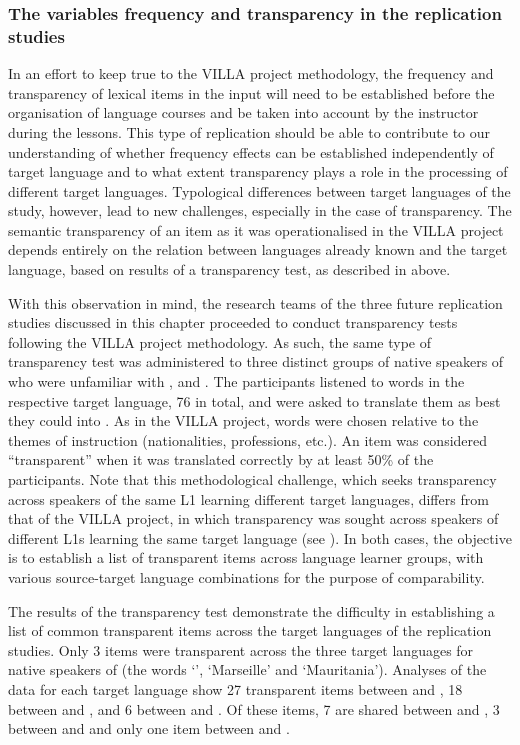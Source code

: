 \documentclass[output=paper,colorlinks,citecolor=brown,modfonts,nonflat]{../langscibook}
\begin{document}
\clearpage
\subsubsection{The variables frequency and transparency in the replication studies}\label{sec:watorek:4.1.2}

In an effort to keep true to the VILLA project methodology, the frequency and transparency of lexical items in the input will need to be established before the organisation of language courses and be taken into account by the instructor during the lessons. This type of replication should be able to contribute to our understanding of whether frequency effects can be established independently of target language and to what extent transparency plays a role in the processing of different target languages. Typological differences between target languages of the study, however, lead to new challenges, especially in the case of transparency. The semantic transparency of an item as it was operationalised in the VILLA project depends entirely on the relation between languages already known and the target language, based on results of a transparency test, as described in  above.

With this observation in mind, the research teams of the three future replication studies discussed in this chapter proceeded to conduct transparency tests following the VILLA project methodology. As such, the same type of transparency test was administered to three distinct groups of native speakers of  who were unfamiliar with ,  and . The participants listened to words in the respective target language, 76 in total, and were asked to translate them as best they could into . As in the VILLA project, words were chosen relative to the themes of instruction (nationalities, professions, etc.). An item was considered “transparent” when it was translated correctly by at least 50\% of the participants. Note that this methodological challenge, which seeks transparency across speakers of the same L1 learning different target languages, differs from that of the VILLA project, in which transparency was sought across speakers of different L1s learning the same target language (see ). In both cases, the objective is to establish a list of transparent items across language learner groups, with various source-target language combinations for the purpose of comparability.

The results of the transparency test demonstrate the difficulty in establishing a list of common transparent items across the target languages of the replication studies. Only 3 items were transparent across the three target languages for native speakers of  (the words ‘’, ‘Marseille’ and ‘Mauritania’). Analyses of the data for each target language show 27 transparent items between  and , 18 between  and , and 6 between  and . Of these items, 7 are shared between  and , 3 between  and  and only one item between  and .
\end{document}
